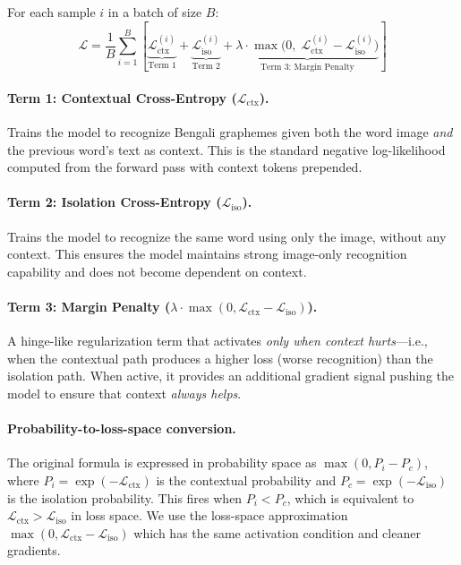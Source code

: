\documentclass[11pt, a4paper]{report}
\begin{document}
\begin{keyequation}
For each sample $i$ in a batch of size $B$:
\begin{equation}
\boxed{
  \mathcal{L} = \frac{1}{B} \sum_{i=1}^{B} \left[ \underbrace{\mathcal{L}_{\mathrm{ctx}}^{(i)}}_{\text{Term 1}} + \underbrace{\mathcal{L}_{\mathrm{iso}}^{(i)}}_{\text{Term 2}} + \underbrace{\lambda \cdot \max\!\Big(0,\; \mathcal{L}_{\mathrm{ctx}}^{(i)} - \mathcal{L}_{\mathrm{iso}}^{(i)}\Big)}_{\text{Term 3: Margin Penalty}} \right]
}
\label{eq:loss}
\end{equation}
\end{keyequation}

\paragraph{Term 1: Contextual Cross-Entropy ($\mathcal{L}_{\mathrm{ctx}}$).} Trains the model to recognize Bengali graphemes given both the word image \emph{and} the previous word's text as context. This is the standard negative log-likelihood computed from the forward pass with context tokens prepended.

\paragraph{Term 2: Isolation Cross-Entropy ($\mathcal{L}_{\mathrm{iso}}$).} Trains the model to recognize the same word using only the image, without any context. This ensures the model maintains strong image-only recognition capability and does not become dependent on context.

\paragraph{Term 3: Margin Penalty ($\lambda \cdot \max(0, \mathcal{L}_{\mathrm{ctx}} - \mathcal{L}_{\mathrm{iso}})$).} A hinge-like regularization term that activates \emph{only when context hurts}---i.e., when the contextual path produces a higher loss (worse recognition) than the isolation path. When active, it provides an additional gradient signal pushing the model to ensure that context \emph{always helps}.

\paragraph{Probability-to-loss-space conversion.} The original formula is expressed in probability space as $\max(0, P_i - P_c)$, where $P_i = \exp(-\mathcal{L}_{\mathrm{ctx}})$ is the contextual probability and $P_c = \exp(-\mathcal{L}_{\mathrm{iso}})$ is the isolation probability. This fires when $P_i < P_c$, which is equivalent to $\mathcal{L}_{\mathrm{ctx}} > \mathcal{L}_{\mathrm{iso}}$ in loss space. We use the loss-space approximation $\max(0, \mathcal{L}_{\mathrm{ctx}} - \mathcal{L}_{\mathrm{iso}})$ which has the same activation condition and cleaner gradients.
\end{document}
